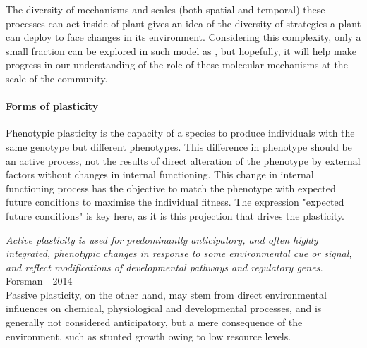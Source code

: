 {\begin{fullwidth}
\begin{tcolorbox}[title=Molecular basis of phenotypic plasticity]
The diversity of mechanisms and scales (both spatial and temporal) these processes can act inside of plant gives an idea of the diversity of strategies a plant can deploy to face changes in its environment. Considering this complexity, only a small fraction can be explored in such model as \model, but hopefully, it will help make progress in our understanding of the role of these molecular mechanisms at the scale of the community.
\end{tcolorbox}
\end{fullwidth}






\paragraph{Forms of plasticity}
Phenotypic plasticity is the capacity of a species to produce individuals with the same genotype but different phenotypes. This difference in phenotype should be an active process, not the results of direct alteration of the phenotype by external factors without changes in internal functioning. This change in internal functioning process has the objective  to match the phenotype with expected future conditions to maximise the individual fitness. The expression "expected future conditions" is key here, as it is this projection that drives the plasticity.

\textit{Active plasticity is used for predominantly anticipatory, and often highly integrated, phenotypic changes in response to some environmental cue or signal, and reflect modifications of developmental pathways and regulatory genes.} Forsman - 2014\\


Passive plasticity, on the other hand, may stem from direct environmental influences on chemical, physiological and developmental processes, and is generally not considered anticipatory, but a mere consequence of the environment, such as stunted growth owing to low resource levels.\\


}
